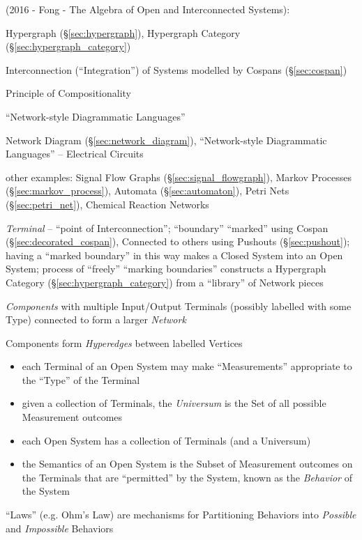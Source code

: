 (2016 - Fong - The Algebra of Open and Interconnected Systems):

\fist Hypergraph (\S\ref{sec:hypergraph}), Hypergraph Category
(\S\ref{sec:hypergraph_category})

Interconnection (``Integration'') of Systems modelled by Cospans
(\S\ref{sec:cospan})

Principle of Compositionality

``Network-style Diagrammatic Languages''

Network Diagram (\S\ref{sec:network_diagram}), ``Network-style
Diagrammatic Languages'' -- Electrical Circuits

other examples: Signal Flow Graphs (\S\ref{sec:signal_flowgraph}),
Markov Processes (\S\ref{sec:markov_process}), Automata
(\S\ref{sec:automaton}), Petri Nets (\S\ref{sec:petri_net}), Chemical
Reaction Networks

\emph{Terminal} -- ``point of Interconnection''; ``boundary''
``marked'' using Cospan (\S\ref{sec:decorated_cospan}), Connected to
others using Pushouts (\S\ref{sec:pushout}); having a ``marked
boundary'' in this way makes a Closed System into an Open System;
process of ``freely''  ``marking boundaries'' constructs a Hypergraph
Category (\S\ref{sec:hypergraph_category}) from a ``library'' of
Network pieces

\emph{Components} with multiple Input/Output Terminals (possibly
labelled with some Type) connected to form a larger \emph{Network}

Components form \emph{Hyperedges} between labelled Vertices

\begin{itemize}
  \item each Terminal of an Open System may make ``Measurements''
    appropriate to the ``Type'' of the Terminal
  \item given a collection of Terminals, the \emph{Universum} is the
    Set of all possible Measurement outcomes
  \item each Open System has a collection of Terminals (and a Universum)
  \item the Semantics of an Open System is the Subset of Measurement
    outcomes on the Terminals that are ``permitted'' by the System,
    known as the \emph{Behavior} of the System
\end{itemize}


``Laws'' (e.g. Ohm's Law) are mechanisms for Partitioning Behaviors
into \emph{Possible} and \emph{Impossible} Behaviors

